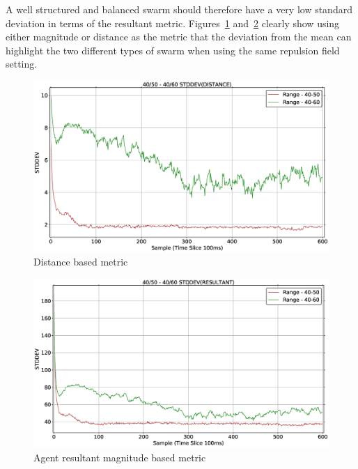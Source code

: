 A well structured and balanced swarm should therefore have a very low standard deviation in terms of the resultant metric. Figures~\ref{methods:StabilityDistanceSwarm} and~\ref{methods:StabilityMagnitudeSwarm} clearly show using either magnitude or distance as the metric that the deviation from the mean can highlight the two different types of swarm when using the same repulsion field setting.
\begin{figure}[H]
\begin{center}
\includegraphics[width=13cm]{CHAPTER-5/figures/StabilityDistanceSwarm}
\end{center}
\caption{Distance based metric\label{methods:StabilityDistanceSwarm}}
\end{figure}
\begin{figure}[H]
\begin{center}
\includegraphics[width=13cm]{CHAPTER-5/figures/StabilityMagnitudeSwarm}
\end{center}
\caption{Agent resultant magnitude based metric\label{methods:StabilityMagnitudeSwarm}}
\end{figure}

